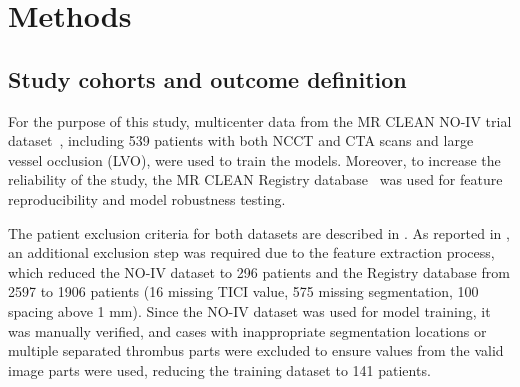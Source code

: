 \documentclass[preprint,12pt]{elsarticle}
\begin{document}












\section{Methods}

\subsection{Study cohorts and outcome definition}


For the purpose of this study, multicenter data from the MR CLEAN NO-IV trial dataset~\cite{Jansen2018}, including 539 patients with both NCCT and CTA scans and large vessel occlusion (LVO), were used to train the models. Moreover, to increase the reliability of the study, the MR CLEAN Registry database~\cite{IvoGHJansen20180309} was used for feature reproducibility and model robustness testing. 


The patient exclusion criteria for both datasets are described in \cite{Mojtahedi2024}. As reported in \cite{Nemcekova2025}, an additional exclusion step was required due to the feature extraction process, which reduced the NO-IV dataset to 296 patients and the Registry database from 2597 to 1906 patients (16 missing TICI value, 575 missing segmentation, 100 spacing above 1 mm). Since the NO-IV dataset was used for model training, it was manually verified, and cases with inappropriate segmentation locations or multiple separated thrombus parts were excluded to ensure values from the valid image parts were used, reducing the training dataset to 141 patients. 
\end{document}
